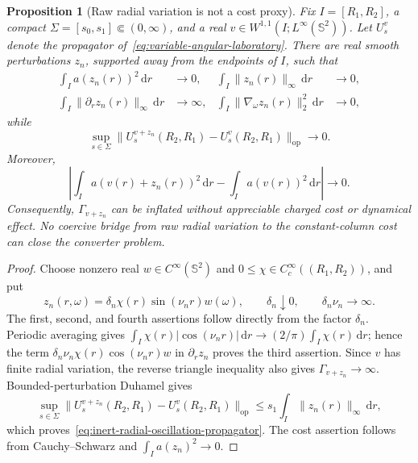 \documentclass[11pt]{article}
\newcommand{\dd}{\,\mathrm d}
\newtheorem{proposition}[theorem]{Proposition}
\theoremstyle{definition}
\theoremstyle{remark}
\begin{document}
\begin{proposition}[Raw radial variation is not a cost proxy]
\label{prop:raw-radial-variation-no-go}
Fix $I=[R_1,R_2]$, a compact
$\Sigma=[s_0,s_1]\Subset(0,\infty)$, and a real
$v\in W^{1,1}(I;L^\infty(\mathbb S^2))$.  Let $U_s^v$ denote the propagator
of~\eqref{eq:variable-angular-laboratory}.  There are real smooth
perturbations $z_n$, supported away from the endpoints of $I$, such that
\begin{align}
 \int_I a(z_n(r))^2\dd r&\longrightarrow0,
 &
 \int_I\|z_n(r)\|_\infty\dd r&\longrightarrow0,
 \label{eq:inert-radial-oscillation-small}\\
 \int_I\|\partial_rz_n(r)\|_\infty\dd r&\longrightarrow\infty,
 &
 \int_I\|\nabla_\omega z_n(r)\|_2^2\dd r&\longrightarrow0,
 \label{eq:inert-radial-oscillation-rough}
\end{align}
while
\begin{equation}
 \sup_{s\in\Sigma}
 \|U_s^{v+z_n}(R_2,R_1)-U_s^v(R_2,R_1)\|_{\mathrm{op}}
 \longrightarrow0.
 \label{eq:inert-radial-oscillation-propagator}
\end{equation}
Moreover,
\begin{equation}
 \left|
 \int_Ia(v(r)+z_n(r))^2\dd r
 -\int_Ia(v(r))^2\dd r
 \right|\longrightarrow0.
\end{equation}
Consequently,
$\Gamma_{v+z_n}$ can be inflated without appreciable charged cost or dynamical
effect.  No coercive bridge from raw radial variation to the constant-column
cost can close the converter problem.
\end{proposition}

\begin{proof}
Choose nonzero real $w\in C^\infty(\mathbb S^2)$ and
$0\leq\chi\in C_c^\infty((R_1,R_2))$, and put
\begin{equation}
 z_n(r,\omega)
 =\delta_n\chi(r)\sin(\nu_nr)w(\omega),
 \qquad
 \delta_n\downarrow0,
 \qquad
 \delta_n\nu_n\longrightarrow\infty.
\end{equation}
The first, second, and fourth assertions follow directly from the factor
$\delta_n$.  Periodic averaging gives
$\int_I\chi(r)|\cos(\nu_nr)|\dd r\to
(2/\pi)\int_I\chi(r)\dd r$; hence the term
$\delta_n\nu_n\chi(r)\cos(\nu_nr)w$ in $\partial_rz_n$ proves the third
assertion.  Since $v$ has finite radial variation, the reverse triangle
inequality also gives $\Gamma_{v+z_n}\to\infty$.
Bounded-perturbation Duhamel gives
\begin{equation}
 \sup_{s\in\Sigma}
 \|U_s^{v+z_n}(R_2,R_1)-U_s^v(R_2,R_1)\|_{\mathrm{op}}
 \leq s_1\int_I\|z_n(r)\|_\infty\dd r,
\end{equation}
which proves~\eqref{eq:inert-radial-oscillation-propagator}.  The cost
assertion follows from Cauchy--Schwarz and
$\int_Ia(z_n)^2\to0$.
\end{proof}
\end{document}

